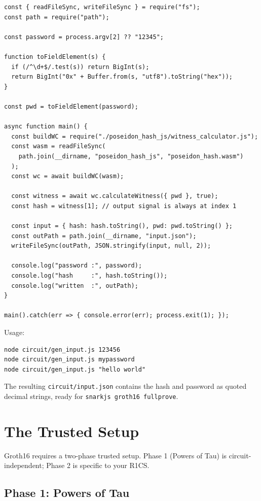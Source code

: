 \begin{verbatim}
const { readFileSync, writeFileSync } = require("fs");
const path = require("path");

const password = process.argv[2] ?? "12345";

function toFieldElement(s) {
  if (/^\d+$/.test(s)) return BigInt(s);
  return BigInt("0x" + Buffer.from(s, "utf8").toString("hex"));
}

const pwd = toFieldElement(password);

async function main() {
  const buildWC = require("./poseidon_hash_js/witness_calculator.js");
  const wasm = readFileSync(
    path.join(__dirname, "poseidon_hash_js", "poseidon_hash.wasm")
  );
  const wc = await buildWC(wasm);

  const witness = await wc.calculateWitness({ pwd }, true);
  const hash = witness[1]; // output signal is always at index 1

  const input = { hash: hash.toString(), pwd: pwd.toString() };
  const outPath = path.join(__dirname, "input.json");
  writeFileSync(outPath, JSON.stringify(input, null, 2));

  console.log("password :", password);
  console.log("hash     :", hash.toString());
  console.log("written  :", outPath);
}

main().catch(err => { console.error(err); process.exit(1); });
\end{verbatim}

Usage:

\begin{verbatim}
node circuit/gen_input.js 123456
node circuit/gen_input.js mypassword
node circuit/gen_input.js "hello world"
\end{verbatim}

The resulting \texttt{circuit/input.json} contains the hash and password as
quoted decimal strings, ready for \texttt{snarkjs groth16 fullprove}.

\section{The Trusted Setup} \label{sec:ch6-trusted-setup}

Groth16 requires a two-phase trusted setup. Phase 1 (Powers of Tau) is
circuit-independent; Phase 2 is specific to your R1CS.

\subsection*{Phase 1: Powers of Tau}


